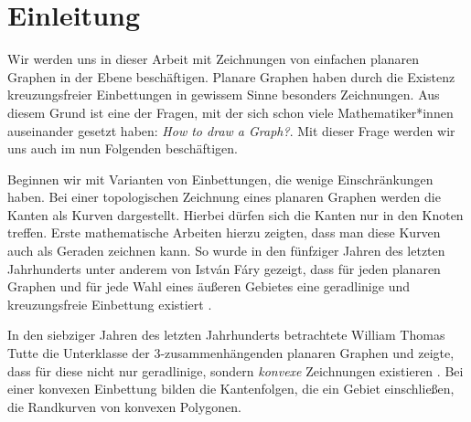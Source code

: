 \chapter{Einleitung}
Wir werden uns in dieser Arbeit mit Zeichnungen von einfachen planaren Graphen in der Ebene beschäftigen. Planare Graphen haben durch die Existenz kreuzungsfreier Einbettungen in gewissem Sinne besonders \grqq{ } Zeichnungen. Aus diesem Grund ist eine der Fragen, mit der sich schon viele Mathematiker*innen auseinander gesetzt haben: \glqq\textit{How to draw a Graph?}\grqq\cite{tutte63}. Mit dieser Frage werden wir uns auch im nun Folgenden beschäftigen. 

Beginnen wir mit Varianten von Einbettungen, die wenige Einschränkungen haben. Bei einer topologischen Zeichnung eines planaren Graphen werden die Kanten als Kurven dargestellt. Hierbei dürfen sich die Kanten nur in den Knoten treffen. Erste mathematische Arbeiten hierzu zeigten, dass man diese Kurven auch als Geraden zeichnen kann. So wurde in den fünfziger Jahren des letzten Jahrhunderts unter anderem von István Fáry gezeigt, dass für jeden planaren Graphen und für jede Wahl eines äußeren Gebietes eine geradlinige und kreuzungsfreie Einbettung existiert \cite{fary48}.

In den siebziger Jahren des letzten Jahrhunderts betrachtete William Thomas Tutte die Unterklasse der 3-zusam\-men\-hängenden planaren Graphen und zeigte, dass für diese nicht nur geradlinige, sondern \textit{konvexe} Zeichnungen existieren \cite{tutte63}. Bei einer konvexen Einbettung bilden die Kantenfolgen, die ein Gebiet einschließen, die Randkurven von konvexen Polygonen.

